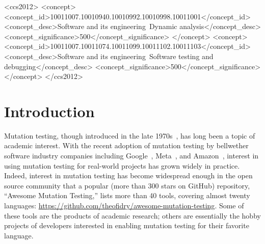 \documentclass[acmsmall,screen,review,anonymous]{acmart}
\begin{document}
\begin{CCSXML}
<ccs2012>
<concept>
<concept_id>10011007.10010940.10010992.10010998.10011001</concept_id>
<concept_desc>Software and its engineering~Dynamic analysis</concept_desc>
<concept_significance>500</concept_significance>
</concept>
<concept>
<concept_id>10011007.10011074.10011099.10011102.10011103</concept_id>
<concept_desc>Software and its engineering~Software testing and debugging</concept_desc>
<concept_significance>500</concept_significance>
</concept>
</ccs2012>
\end{CCSXML}






\maketitle

\section{Introduction}

Mutation testing, though introduced in the late
1970s~\cite{demillo1978hints,mathur2012foundations,demillo1978hints},
has long been a topic of academic interest.  With the recent adoption of mutation
testing by bellwether software industry companies including
Google~\cite{GoogleMut}, Meta~\cite{BellerFacebookMutation}, and
Amazon~\cite{AmazonMut}, interest in using mutation testing for
real-world projects has grown widely in practice. 
%
Indeed, interest in mutation testing has become widespread enough in the open
source community that a popular (more than 300 stars on GitHub)
repository, ``Awesome Mutation Testing,'' lists more than 40 tools,
covering almost twenty languages:
\url{https://github.com/theofidry/awesome-mutation-testing}.  Some of
these tools are the products of academic research; others are
essentially the hobby projects of developers interested in enabling
mutation testing for their favorite language.
\end{document}
